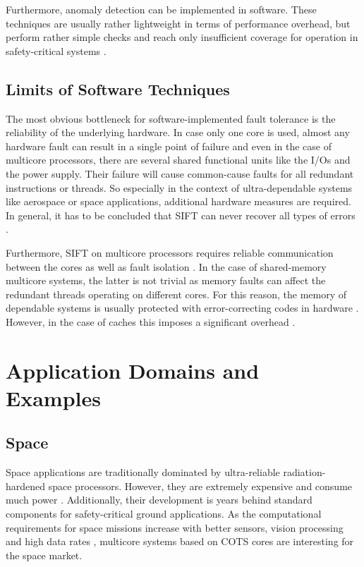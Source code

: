 \documentclass[conference]{IEEEtran}
\begin{document}
Furthermore, anomaly detection can be implemented in software. These techniques are usually rather lightweight in terms of performance overhead, but perform rather simple checks and reach only insufficient coverage for operation in safety-critical systems \cite{Gizopoulos2011}.

\subsection{Limits of Software Techniques}

The most obvious bottleneck for software-implemented fault tolerance is the reliability of the underlying hardware. In case only one core is used, almost any hardware fault can result in a single point of failure and even in the case of multicore processors, there are several shared functional units like the I/Os and the power supply. Their failure will cause common-cause faults for all redundant instructions or threads. So especially in the context of ultra-dependable systems like aerospace or space applications, additional hardware measures are required. In general, it has to be concluded that SIFT can never recover all types of errors \cite{Villalpando2011}.

Furthermore, SIFT on multicore processors requires reliable communication between the cores as well as fault isolation \cite{Villalpando2011}. In the case of shared-memory multicore systems, the latter is not trivial as memory faults can affect the redundant threads operating on different cores. For this reason, the memory of dependable systems is usually protected with error-correcting codes in hardware \cite{Nezzari2017}. However, in the case of caches this imposes a significant overhead \cite{Sorin2009}.

\section{Application Domains and Examples}
\label{sec:applications}

\subsection{Space}

Space applications are traditionally dominated by ultra-reliable radiation-hardened space processors. However, they are extremely expensive and consume much power \cite{Iturbe2019}. Additionally, their development is years behind standard components for safety-critical ground applications. As the computational requirements for space missions increase with better sensors, vision processing and high data rates \cite{Cudmore2019}, multicore systems based on COTS cores are interesting for the space market.
\end{document}
